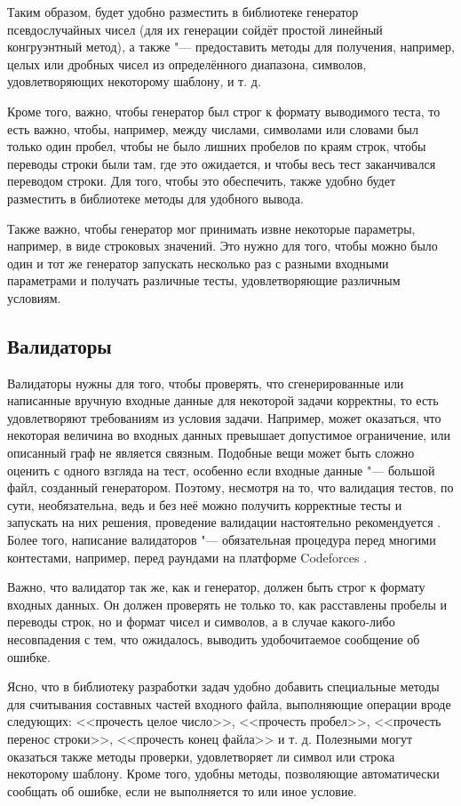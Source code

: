 Таким образом, будет удобно разместить в библиотеке генератор псевдослучайных чисел (для их генерации сойдёт простой линейный конгруэнтный метод), а также "--- предоставить методы для получения, например, целых или дробных чисел из определённого диапазона, символов, удовлетворяющих некоторому шаблону, и т. д.

Кроме того, важно, чтобы генератор был строг к формату выводимого теста, то есть важно, чтобы, например, между числами, символами или словами был только один пробел, чтобы не было лишних пробелов по краям строк, чтобы переводы строки были там, где это ожидается, и чтобы весь тест заканчивался переводом строки. Для того, чтобы это обеспечить, также удобно будет разместить в библиотеке методы для удобного вывода.

Также важно, чтобы генератор мог принимать извне некоторые параметры, например, в виде строковых значений. Это нужно для того, чтобы можно было один и тот же генератор запускать несколько раз с разными входными параметрами и получать различные тесты, удовлетворяющие различным условиям.

\subsection{Валидаторы}

Валидаторы нужны для того, чтобы проверять, что сгенерированные или написанные вручную входные данные для некоторой задачи корректны, то есть удовлетворяют требованиям из условия задачи. Например, может оказаться, что некоторая величина во входных данных превышает допустимое ограничение, или описанный граф не является связным. Подобные вещи может быть сложно оценить с одного взгляда на тест, особенно если входные данные "--- большой файл, созданный генератором. Поэтому, несмотря на то, что валидация тестов, по сути, необязательна, ведь и без неё можно получить корректные тесты и запускать на них решения, проведение валидации настоятельно рекомендуется \cite{testlib}. Более того, написание валидаторов "--- обязательная процедура перед многими контестами, например, перед раундами на платформе Codeforces \cite{codeforces}.

Важно, что валидатор так же, как и генератор, должен быть строг к формату входных данных. Он должен проверять не только то, как расставлены пробелы и переводы строк, но и формат чисел и символов, а в случае какого-либо несовпадения с тем, что ожидалось, выводить удобочитаемое сообщение об ошибке.

Ясно, что в библиотеку разработки задач удобно добавить специальные методы для считывания составных частей входного файла, выполняющие операции вроде следующих: <<прочесть целое число>>, <<прочесть пробел>>, <<прочесть перенос строки>>, <<прочесть конец файла>> и т. д. Полезными могут оказаться также методы проверки, удовлетворяет ли символ или строка некоторому шаблону. Кроме того, удобны методы, позволяющие автоматически сообщать об ошибке, если не выполняется то или иное условие.

